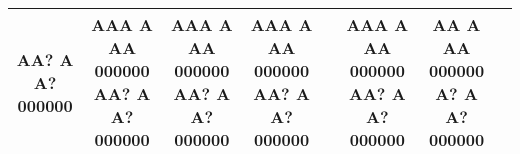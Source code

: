 \begin{tabular}{|*{7}{@{}c@{}|}l|}
        {A}{A}{?} {A} {A}{?}   {0}{0}{0}{0}{0}{0} &       %
        {A}{A}{A} {A} {A}{A}   {0}{0}{0}{0}{0}{0}         %
        {A}{A}{?} {A} {A}{?}   {0}{0}{0}{0}{0}{0} &       %
        {A}{A}{A} {A} {A}{A}   {0}{0}{0}{0}{0}{0}         %
        {A}{A}{?} {A} {A}{?}   {0}{0}{0}{0}{0}{0} &       %
        {A}{A}{A} {A} {A}{A}   {0}{0}{0}{0}{0}{0}         %
        {A}{A}{?} {A} {A}{?}   {0}{0}{0}{0}{0}{0} &&      %
        {A}{A}{A} {A} {A}{A}   {0}{0}{0}{0}{0}{0}         %
        {A}{A}{?} {A} {A}{?}   {0}{0}{0}{0}{0}{0} &       %
        {A}{}{A} {A} {A}{A}   {0}{0}{0}{0}{0}{0}         %
        {}{A}{?} {A} {A}{?}   {0}{0}{0}{0}{0}{0} &       %
\\ \hline \end{tabular}
\hspace*{-1.50in}
